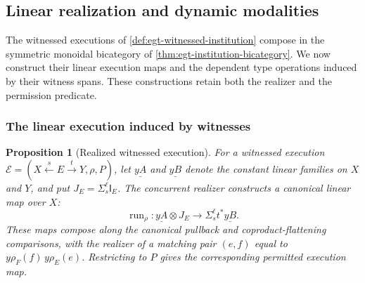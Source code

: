 \documentclass[11pt,a4paper]{article}
\numberwithin{equation}{section}
\newtheorem{proposition}[theorem]{Proposition}
\theoremstyle{definition}
\theoremstyle{remark}
\theoremstyle{plain}
\providecommand{\I}{\mathsf{I}}
\begin{document}
\subsection{Linear realization and dynamic modalities}
\label{agt-sec-institutions}

The witnessed executions of \cref{def:egt-witnessed-institution} compose
in the symmetric monoidal bicategory of
\cref{thm:egt-institution-bicategory}. We now construct their linear
execution maps and the dependent type operations induced by their witness
spans. These constructions retain both the realizer and the permission
predicate.

\subsubsection{The linear execution induced by witnesses}
\label{agt-sec-institution-run}

\begin{proposition}[Realized witnessed execution]
\label{agt-prop-witness-run}
For a witnessed execution
$\mathcal E=(X\xleftarrow{s}E\xrightarrow{t}Y,\rho,P)$,
let $\underline{yA}$ and $\underline{yB}$ denote the constant linear
families on $X$ and $Y$, and put $J_E=\Sigma_s^\ell\I_E$.
The concurrent realizer constructs a canonical linear map over $X$:
\begin{equation}
 \operatorname{run}_\rho:
 \underline{yA}\otimes J_E\longrightarrow
 \Sigma_s^\ell t^*\underline{yB}.
 \label{agt-eq-witness-run}
\end{equation}
These maps compose along the canonical pullback and coproduct-flattening
comparisons, with the realizer of a matching pair $(e,f)$ equal to
$y\rho_F(f)\,y\rho_E(e)$.  Restricting to $P$ gives the corresponding
permitted execution map.
\end{proposition}
\end{document}
